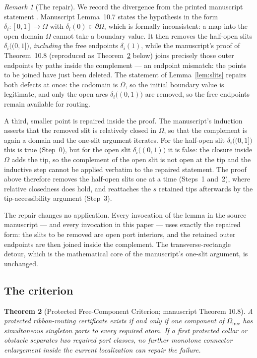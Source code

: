\documentclass[11pt,reqno]{amsart}
\newtheorem{theorem}{Theorem}[section]
\theoremstyle{definition}
\theoremstyle{remark}
\newtheorem{remark}[theorem]{Remark}
\newcommand{\Omfree}{\Omega_{\mathrm{free}}}
\begin{document}
\begin{remark}[The repair]\label{rem:repair}
We record the divergence from the printed manuscript statement \cite{MWman}. Manuscript
Lemma~10.7 states the hypothesis in the form
$\delta_i\colon[0,1]\to\Omega$ with $\delta_i(0)\in\partial\Omega$, which is formally
inconsistent: a map into the open domain $\Omega$ cannot take a boundary value. It then
removes the half-open slits $\delta_i\bigl((0,1]\bigr)$, \emph{including} the free
endpoints $\delta_i(1)$, while the manuscript's proof of Theorem~10.8 (reproduced as
Theorem~\ref{thm:free-component} below) joins precisely those outer endpoints by paths
inside the complement --- an endpoint mismatch: the points to be joined have just been
deleted. The statement of Lemma~\ref{lem:slits} repairs both defects at once: the
codomain is $\overline{\Omega}$, so the initial boundary value is legitimate, and only
the open arcs $\delta_i\bigl((0,1)\bigr)$ are removed, so the free endpoints remain
available for routing.

A third, smaller point is repaired inside the proof. The manuscript's induction asserts
that the removed slit is relatively closed in $\Omega$, so that the complement is again
a domain and the one-slit argument iterates. For the half-open slit
$\delta_i\bigl((0,1]\bigr)$ this is true (Step~0), but for the open slit
$\delta_i\bigl((0,1)\bigr)$ it is false: the closure inside $\Omega$ adds the tip, so
the complement of the open slit is not open at the tip and the inductive step cannot be
applied verbatim to the repaired statement. The proof above therefore removes the
half-open slits one at a time (Steps~1 and~2), where relative closedness does hold, and
reattaches the $s$ retained tips afterwards by the tip-accessibility argument (Step~3).

The repair changes no application. Every invocation of the lemma in the source
manuscript --- and every invocation in this paper --- uses exactly the repaired form:
the slits to be removed are open port interiors, and the retained outer endpoints are
then joined inside the complement. The transverse-rectangle detour, which is the
mathematical core of the manuscript's one-slit argument, is unchanged.
\end{remark}

\subsection{The criterion}\label{subsec:D-criterion}

\begin{theorem}[Protected Free-Component Criterion; manuscript Theorem 10.8]
\label{thm:free-component}
A protected ribbon-routing certificate exists if and only if one component of $\Omfree$
has simultaneous singleton ports to every required atom. If a first protected collar or
obstacle separates two required port classes, no further monotone connector enlargement
inside the current localization can repair the failure.
\end{theorem}
\end{document}
